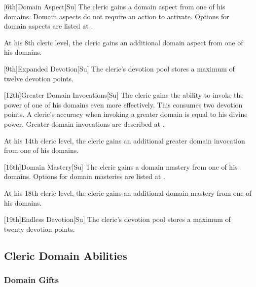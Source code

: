 [6th]{Domain Aspect}[Su]
The cleric gains a domain aspect from one of his domains.
Domain aspects do not require an action to activate.
Options for domain aspects are listed at .

At his 8th cleric level, the cleric gains an additional domain aspect from one of his domains.

[9th]{Expanded Devotion}[Su]
The cleric's devotion pool stores a maximum of twelve devotion points.

[12th]{Greater Domain Invocations}[Su]
The cleric gains the ability to invoke the power of one of his domains even more effectively.
This consumes two devotion points.
A cleric's accuracy when invoking a greater domain is equal to his divine power.
Greater domain invocations are described at .

At his 14th cleric level, the cleric gains an additional greater domain invocation from one of his domains.

[16th]{Domain Mastery}[Su]
The cleric gains a domain mastery from one of his domains.
Options for domain masteries are listed at .

At his 18th cleric level, the cleric gains an additional domain mastery from one of his domains.

[19th]{Endless Devotion}[Su]
The cleric's devotion pool stores a maximum of twenty devotion points.

\subsection{Cleric Domain Abilities}

\subsubsection{Domain Gifts}\label{Domain Gifts}

